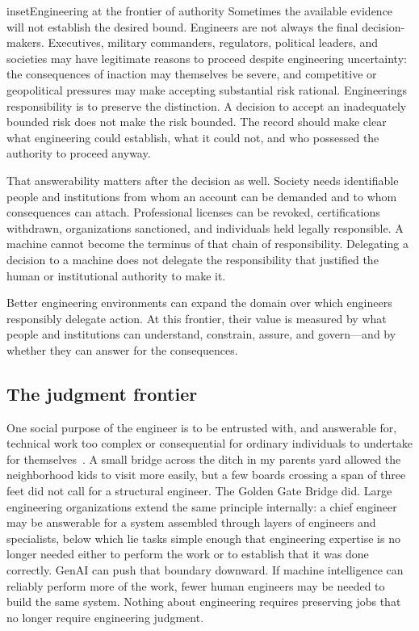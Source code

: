 \begin{bookbox}{inset}{Engineering at the frontier of authority}
Sometimes the available evidence will not establish the desired bound. Engineers are not always the final decision-makers. Executives, military commanders, regulators, political leaders, and societies may have legitimate reasons to proceed despite engineering uncertainty: the consequences of inaction may themselves be severe, and competitive or geopolitical pressures may make accepting substantial risk rational. Engineering\textquotesingle s responsibility is to preserve the distinction. A decision to accept an inadequately bounded risk does not make the risk bounded. The record should make clear what engineering could establish, what it could not, and who possessed the authority to proceed anyway.

That answerability matters after the decision as well. Society needs identifiable people and institutions from whom an account can be demanded and to whom consequences can attach. Professional licenses can be revoked, certifications withdrawn, organizations sanctioned, and individuals held legally responsible. A machine cannot become the terminus of that chain of responsibility. Delegating a decision to a machine does not delegate the responsibility that justified the human or institutional authority to make it.

Better engineering environments can expand the domain over which engineers responsibly delegate action. At this frontier, their value is measured by what people and institutions can understand, constrain, assure, and govern---and by whether they can answer for the consequences.
\end{bookbox}

\subsection{The judgment frontier}\label{heading:the-judgment-frontier}


One social purpose of the engineer is to be entrusted with, and answerable for, technical work too complex or consequential for ordinary individuals to undertake for themselves~\citep{bugliarello-social-function}. A small bridge across the ditch in my parents\textquotesingle{} yard allowed the neighborhood kids to visit more easily, but a few boards crossing a span of three feet did not call for a structural engineer. The Golden Gate Bridge did. Large engineering organizations extend the same principle internally: a chief engineer may be answerable for a system assembled through layers of engineers and specialists, below which lie tasks simple enough that engineering expertise is no longer needed either to perform the work or to establish that it was done correctly. GenAI can push that boundary downward. If machine intelligence can reliably perform more of the work, fewer human engineers may be needed to build the same system. Nothing about engineering requires preserving jobs that no longer require engineering judgment.

